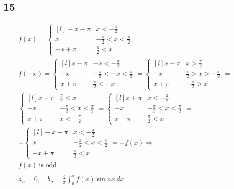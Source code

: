 \newpage


\subsection*{15}


\begin{gather*}
	f(x) =
	\left\{\begin{matrix*}[l]
		-x - \pi	& x < -\frac{\pi}{2} \\
		x			& -\frac{\pi}{2} < x < \frac{\pi}{2} \\
		-x + \pi	& \frac{\pi}{2} < x
	\end{matrix*}\right.
	\\
	f(-x) =
	\left\{\begin{matrix*}[l]
		x - \pi	& -x < -\frac{\pi}{2} \\
		-x			& -\frac{\pi}{2} < -x < \frac{\pi}{2} \\
		x + \pi	& \frac{\pi}{2} < -x
	\end{matrix*}\right. =
	\left\{\begin{matrix*}[l]
		x - \pi	& x > \frac{\pi}{2} \\
		-x			& \frac{\pi}{2} > x > -\frac{\pi}{2} \\
		x + \pi	& -\frac{\pi}{2} > x
	\end{matrix*}\right. =
	\\
	\left\{\begin{matrix*}[l]
		x - \pi	& \frac{\pi}{2} < x \\
		-x			& -\frac{\pi}{2} < x < \frac{\pi}{2} \\
		x + \pi	& x < -\frac{\pi}{2}
	\end{matrix*}\right. =
	\left\{\begin{matrix*}[l]
		x + \pi	& x < -\frac{\pi}{2} \\
		-x			& -\frac{\pi}{2} < x < \frac{\pi}{2} \\
		x - \pi	& \frac{\pi}{2} < x
	\end{matrix*}\right. =
	\\
	-\left\{\begin{matrix*}[l]
		-x - \pi	& x < -\frac{\pi}{2} \\
		x			& -\frac{\pi}{2} < x < \frac{\pi}{2} \\
		-x + \pi	& \frac{\pi}{2} < x
	\end{matrix*}\right. = -f(x) \Rightarrow
	\\
	f(x)\ \text{is odd}
	\\
	\\
	a_n = 0, \quad
	b_n = \frac{2}{\pi} \int_0^\pi{f(x) \sin{n x}\ dx} =

\end{gather*}
